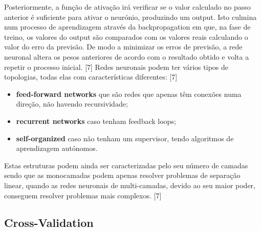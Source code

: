 Posteriormente, a função de ativação irá verificar se o valor calculado no passo anterior é suficiente para ativar o neurónio, produzindo um output. Isto culmina num processo de aprendizagem através da backpropagation em que, na fase de treino, os valores do output são comparados com os valores reais calculando o valor do erro da previsão. De modo a minimizar os erros de previsão, a rede neuronal altera os pesos anteriores de acordo com o resultado obtido e volta a repetir o processo inicial. [7]
Redes neuronais podem ter vários tipos de topologias, todas elas com características diferentes: [7]
\begin{itemize}

\item \textbf{feed-forward networks} que são redes que apenas têm conexões numa direção, não havendo recursividade;    
\item \textbf{recurrent networks} caso tenham feedback loops;
\item \textbf{self-organized} caso não tenham um supervisor, tendo algoritmos de aprendizagem autónomos.

\end{itemize}
    
Estas estruturas podem ainda ser caracterizadas pelo seu número de camadas sendo que as monocamadas podem apenas resolver problemas de separação linear, quando as redes neuronais de multi-camadas, devido ao seu maior poder, conseguem resolver problemas mais complexos. [7]

\subsection{Cross-Validation}


